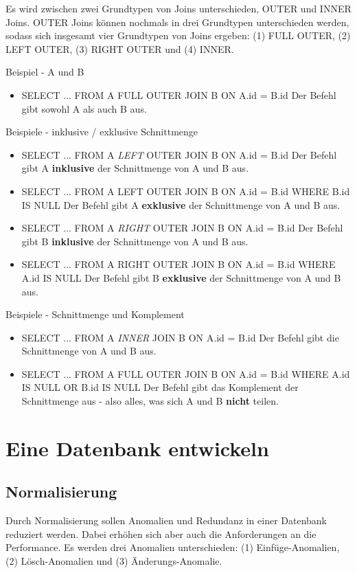 Es wird zwischen zwei Grundtypen von Joins unterschieden, OUTER und INNER Joins. OUTER Joins können nochmals in drei Grundtypen unterschieden werden, sodass sich insgesamt vier Grundtypen von Joins ergeben: (1) FULL OUTER, (2) LEFT OUTER, (3) RIGHT OUTER und (4) INNER. 

Beispiel - A und B
\begin{itemize}
	\item SELECT ... FROM A FULL OUTER JOIN B ON A.id = B.id
	Der Befehl gibt sowohl A als auch B aus.
\end{itemize}

Beispiele - inklusive / exklusive Schnittmenge
\begin{itemize}
	\item SELECT ... FROM A {\it LEFT} OUTER JOIN B ON A.id = B.id
	Der Befehl gibt A {\bf inklusive} der Schnittmenge von A und B aus.
	\item SELECT ... FROM A LEFT OUTER JOIN B ON A.id = B.id WHERE B.id IS NULL
	Der Befehl gibt A {\bf exklusive} der Schnittmenge von A und B aus.
	\item SELECT ... FROM A {\it RIGHT} OUTER JOIN B ON A.id = B.id
	Der Befehl gibt B {\bf inklusive} der Schnittmenge von A und B aus.
	\item SELECT ... FROM A RIGHT OUTER JOIN B ON A.id = B.id WHERE A.id IS NULL
	Der Befehl gibt B {\bf exklusive} der Schnittmenge von A und B aus.
\end{itemize}

Beispiele - Schnittmenge und Komplement
\begin{itemize}
	\item SELECT ... FROM A {\it INNER} JOIN B ON A.id = B.id
	Der Befehl gibt die Schnittmenge von A und B aus.
	\item SELECT ... FROM A FULL OUTER JOIN B ON A.id = B.id WHERE A.id IS NULL OR B.id IS NULL
	Der Befehl gibt das Komplement der Schnittmenge aus - also alles, was sich A und B {\bf nicht} teilen.
\end{itemize}


\section{Eine Datenbank entwickeln}
\subsection{Normalisierung}

Durch Normalisierung sollen Anomalien und Redundanz in einer Datenbank reduziert werden. Dabei erhöhen sich aber auch die Anforderungen an die Performance. Es werden drei Anomalien unterschieden: (1) Einfüge-Anomalien, (2) Lösch-Anomalien und (3) Änderungs-Anomalie.

